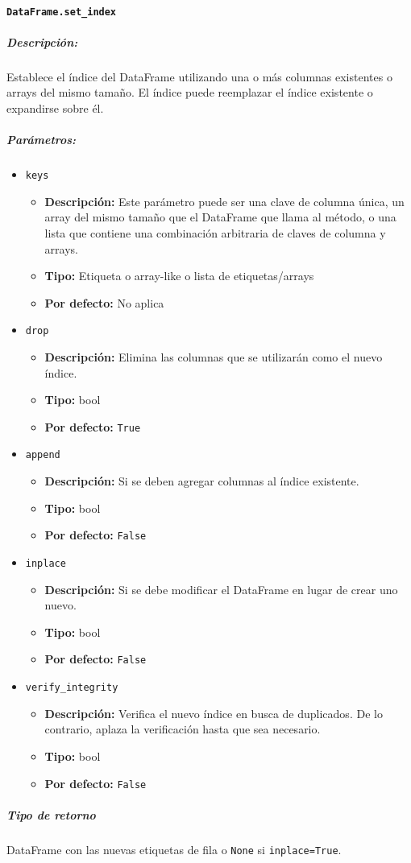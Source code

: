 \paragraph{\texttt{DataFrame.set\_index}}
\subparagraph{Descripción:}
Establece el índice del DataFrame utilizando una o más columnas existentes o arrays del mismo tamaño. El índice puede reemplazar el índice existente o expandirse sobre él.
\subparagraph{Parámetros:}
\begin{itemize}
\item \texttt{keys}
\begin{itemize}
\item \textbf{Descripción:} Este parámetro puede ser una clave de columna única, un array del mismo tamaño que el DataFrame que llama al método, o una lista que contiene una combinación arbitraria de claves de columna y arrays.
\item \textbf{Tipo:} Etiqueta o array-like o lista de etiquetas/arrays
\item \textbf{Por defecto:} No aplica
\end{itemize}
\item \texttt{drop}
\begin{itemize}
\item \textbf{Descripción:} Elimina las columnas que se utilizarán como el nuevo índice.
\item \textbf{Tipo:} bool
\item \textbf{Por defecto:} \texttt{True}
\end{itemize}
\item \texttt{append}
\begin{itemize}
\item \textbf{Descripción:} Si se deben agregar columnas al índice existente.
\item \textbf{Tipo:} bool
\item \textbf{Por defecto:} \texttt{False}
\end{itemize}
\item \texttt{inplace}
\begin{itemize}
\item \textbf{Descripción:} Si se debe modificar el DataFrame en lugar de crear uno nuevo.
\item \textbf{Tipo:} bool
\item \textbf{Por defecto:} \texttt{False}
\end{itemize}
\item \texttt{verify\_integrity}
\begin{itemize}
\item \textbf{Descripción:} Verifica el nuevo índice en busca de duplicados. De lo contrario, aplaza la verificación hasta que sea necesario.
\item \textbf{Tipo:} bool
\item \textbf{Por defecto:} \texttt{False}
\end{itemize}
\end{itemize}
\subparagraph{Tipo de retorno}
DataFrame con las nuevas etiquetas de fila o \texttt{None} si \texttt{inplace=True}.
